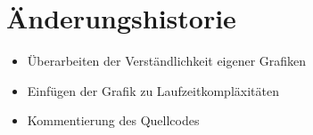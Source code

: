 \section*{Änderungshistorie}
    \begin{itemize}
        \item Überarbeiten der Verständlichkeit eigener Grafiken
        \item Einfügen der Grafik zu Laufzeitkompläxitäten
        \item Kommentierung des Quellcodes
    \end{itemize}
